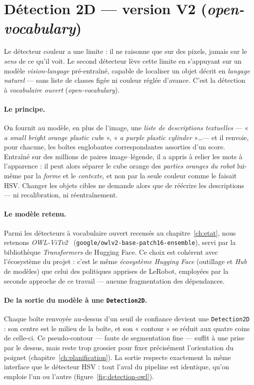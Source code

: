 \section{Détection 2D --- version V2 (\textit{open-vocabulary})}
\label{sec:detection-v2}

Le détecteur couleur a une limite : il ne raisonne que sur des pixels, jamais sur le \emph{sens} de ce qu'il voit. Le second détecteur lève cette limite en s'appuyant sur un modèle \emph{vision-langage} pré-entraîné, capable de localiser un objet décrit en \emph{langage naturel} --- sans liste de classes figée ni couleur réglée d'avance. C'est la détection à \emph{vocabulaire ouvert} (\emph{open-vocabulary}).

\paragraph{Le principe.} On fournit au modèle, en plus de l'image, une \emph{liste de descriptions textuelles} --- « \emph{a small bright orange plastic cube} », « \emph{a purple plastic cylinder} »\dots --- et il renvoie, pour chacune, les boîtes englobantes correspondantes assorties d'un score. Entraîné sur des millions de paires image--légende, il a appris à relier les mots à l'apparence : il peut alors séparer le cube orange des \emph{parties oranges du robot} lui-même par la \emph{forme} et le \emph{contexte}, et non par la seule couleur comme le faisait HSV. Changer les objets cibles ne demande alors que de réécrire les descriptions --- ni recalibration, ni réentraînement.

\paragraph{Le modèle retenu.} Parmi les détecteurs à vocabulaire ouvert recensés au chapitre~\ref{ch:etat}, nous retenons \emph{OWL-ViTv2}~\cite{minderer_owlv2_2023} (\texttt{google/owlv2-base-patch16-ensemble}), servi par la bibliothèque \emph{Transformers} de Hugging Face. Ce choix est cohérent avec l'écosystème du projet : c'est le même \emph{écosystème Hugging Face} (outillage et \emph{Hub} de modèles) que celui des politiques apprises de LeRobot, employées par la seconde approche de ce travail --- aucune fragmentation des dépendances.

\paragraph{De la sortie du modèle à une \texttt{Detection2D}.} Chaque boîte renvoyée au-dessus d'un seuil de confiance devient une \texttt{Detection2D} : son centre est le milieu de la boîte, et son « contour » se réduit aux quatre coins de celle-ci. Ce pseudo-contour --- faute de segmentation fine --- suffit à une prise par le dessus, mais reste trop grossier pour fixer précisément l'orientation du poignet (chapitre~\ref{ch:planification}). La sortie respecte exactement la même interface que le détecteur HSV : tout l'aval du pipeline est identique, qu'on emploie l'un ou l'autre (figure~\ref{fig:detection-owl}).

